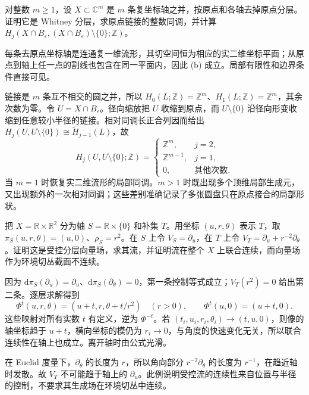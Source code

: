 \begin{exercise}\label{g2:ex:normal-crossing-link-homology}
	对整数 \(m\geq1\)，设 \(X\subset\mathbb C^m\) 是 \(m\) 条复坐标轴之并，按原点和各轴去掉原点分层。证明它是 Whitney 分层，求原点链接的整数同调，并计算 \(H_j(X\cap B_\varepsilon,(X\cap B_\varepsilon)\setminus\{0\};\mathbb Z)\)。
\end{exercise}
\begin{solution}
	每条去原点坐标轴是连通复一维流形，其切空间恒为相应的实二维坐标平面；从原点到轴上任一点的割线也包含在同一平面内，因此 (b) 成立。局部有限性和边界条件直接可见。

	链接是 \(m\) 条互不相交的圆之并，所以 \(H_0(L;\mathbb Z)=\mathbb Z^m\)、\(H_1(L;\mathbb Z)=\mathbb Z^m\)，其余次数为零。令 \(U=X\cap B_\varepsilon\)。径向缩放把 \(U\) 收缩到原点，而 \(U\setminus\{0\}\) 沿径向形变收缩到任意较小半径的链接。相对同调长正合列因而给出 \(H_j(U,U\setminus\{0\})\cong\widetilde H_{j-1}(L)\)，故
	\[
		H_j(U,U\setminus\{0\};\mathbb Z)=
		\begin{cases}
			\mathbb Z^m,&j=2,\\
			\mathbb Z^{m-1},&j=1,\\
			0,&\text{其他次数}.
		\end{cases}
	\]
	当 \(m=1\) 时恢复实二维流形的局部同调。\(m>1\) 时既出现多个顶维局部生成元，又出现额外的一次相对同调；这些差别准确记录了多张圆盘只在原点接合的局部形状。
\end{solution}

\begin{exercise}\label{g2:ex:controlled-rapid-rotation}
	把 \(X=\mathbb R\times\mathbb R^2\) 分为轴 \(S=\mathbb R\times\{0\}\) 和补集 \(T\)。用坐标 \((u,r,\theta)\) 表示 \(T\)，取 \(\pi_S(u,r,\theta)=(u,0)\)、\(\rho_S=r^2\)。在 \(S\) 上令 \(V_S=\partial_u\)，在 \(T\) 上令 \(V_T=\partial_u+r^{-2}\partial_\theta\)。证明这是受控分层向量场，求其流，并证明流在整个 \(X\) 上联合连续，而向量场作为环境切丛截面不连续。
\end{exercise}
\begin{solution}
	因为 \(\mathrm{d}\pi_S(\partial_u)=\partial_u\)、\(\mathrm{d}\pi_S(\partial_\theta)=0\)，第一条控制等式成立；\(V_T(r^2)=0\) 给出第二条。逐层求解得到
	\[
		\Phi^t(u,r,\theta)=(u+t,r,\theta+t/r^2)\quad(r>0),
		\qquad \Phi^t(u,0)=(u+t,0).
	\]
	这些映射对所有实数 \(t\) 有定义，逆为 \(\Phi^{-t}\)。若 \((t_i,u_i,r_i,\theta_i)\to(t,u,0)\)，则像的轴坐标趋于 \(u+t\)，横向坐标的模仍为 \(r_i\to0\)，与角度的快速变化无关，所以联合连续性在轴上也成立。离开轴时由公式光滑。

	在 Euclid 度量下，\(\partial_\theta\) 的长度为 \(r\)，所以角向部分 \(r^{-2}\partial_\theta\) 的长度为 \(r^{-1}\)，在趋近轴时发散。故 \(V_T\) 不可能趋于轴上的 \(\partial_u\)。此例说明受控流的连续性来自位置与半径的控制，不要求其生成场在环境切丛中连续。
\end{solution}

